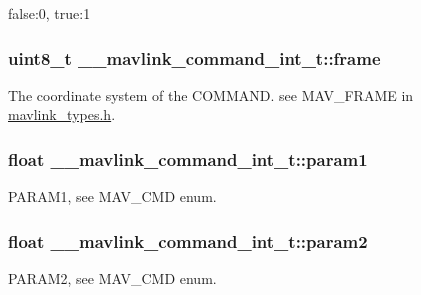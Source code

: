 false\+:0, true\+:1 

\hypertarget{struct____mavlink__command__int__t_abf1f99246744ecd6c296286009c2684e}{
\subsubsection[{frame}]{\setlength{\rightskip}{0pt plus 5cm}uint8\+\_\+t \+\_\+\+\_\+mavlink\+\_\+command\+\_\+int\+\_\+t\+::frame}}\label{struct____mavlink__command__int__t_abf1f99246744ecd6c296286009c2684e}


The coordinate system of the C\+O\+M\+M\+A\+N\+D. see M\+A\+V\+\_\+\+F\+R\+A\+M\+E in \hyperlink{mavlink__types_8h}{mavlink\+\_\+types.\+h}. 

\hypertarget{struct____mavlink__command__int__t_a42b467f31f178ee9b8f9d0b7c03f3c97}{
\subsubsection[{param1}]{\setlength{\rightskip}{0pt plus 5cm}float \+\_\+\+\_\+mavlink\+\_\+command\+\_\+int\+\_\+t\+::param1}}\label{struct____mavlink__command__int__t_a42b467f31f178ee9b8f9d0b7c03f3c97}


P\+A\+R\+A\+M1, see M\+A\+V\+\_\+\+C\+M\+D enum. 

\hypertarget{struct____mavlink__command__int__t_ab10e74c14c186f8b416321d5dda78697}{
\subsubsection[{param2}]{\setlength{\rightskip}{0pt plus 5cm}float \+\_\+\+\_\+mavlink\+\_\+command\+\_\+int\+\_\+t\+::param2}}\label{struct____mavlink__command__int__t_ab10e74c14c186f8b416321d5dda78697}


P\+A\+R\+A\+M2, see M\+A\+V\+\_\+\+C\+M\+D enum. 

